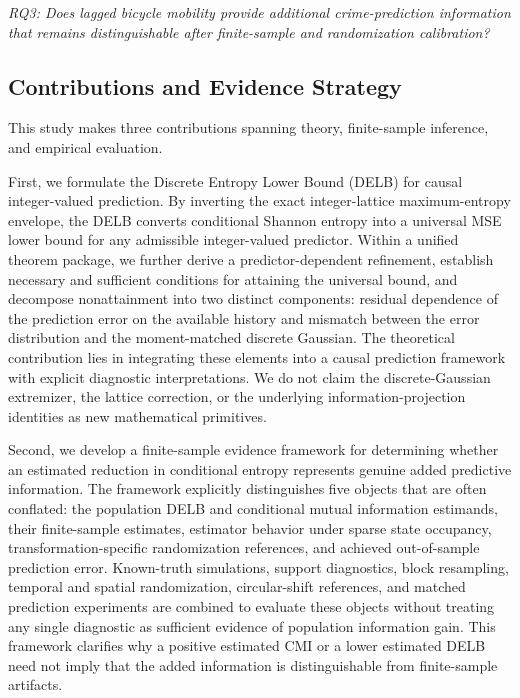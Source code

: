 \documentclass[applsci,article,submit,moreauthors]{Definitions/mdpi}
\begin{document}
\emph{RQ3: Does lagged bicycle mobility provide additional crime-prediction
information that remains distinguishable after finite-sample and
randomization calibration?}

\subsection{Contributions and Evidence Strategy}
\label{subsec:intro_contributions}

This study makes three contributions spanning theory, finite-sample
inference, and empirical evaluation.

First, we formulate the Discrete Entropy Lower Bound (DELB) for causal
integer-valued prediction. By inverting the exact integer-lattice
maximum-entropy envelope, the DELB converts conditional Shannon entropy
into a universal MSE lower bound for any admissible integer-valued
predictor. Within a unified theorem package, we further derive a
predictor-dependent refinement, establish necessary and sufficient
conditions for attaining the universal bound, and decompose nonattainment
into two distinct components: residual dependence of the prediction error
on the available history and mismatch between the error distribution and
the moment-matched discrete Gaussian. The theoretical contribution lies
in integrating these elements into a causal prediction framework with
explicit diagnostic interpretations. We do not claim the discrete-Gaussian
extremizer, the lattice correction, or the underlying information-projection
identities as new mathematical primitives.

Second, we develop a finite-sample evidence framework for determining
whether an estimated reduction in conditional entropy represents genuine
added predictive information. The framework explicitly distinguishes five
objects that are often conflated: the population DELB and conditional
mutual information estimands, their finite-sample estimates, estimator
behavior under sparse state occupancy, transformation-specific
randomization references, and achieved out-of-sample prediction error.
Known-truth simulations, support diagnostics, block resampling, temporal
and spatial randomization, circular-shift references, and matched
prediction experiments are combined to evaluate these objects without
treating any single diagnostic as sufficient evidence of population
information gain. This framework clarifies why a positive estimated
CMI or a lower estimated DELB need not imply that the added information
is distinguishable from finite-sample artifacts.
\end{document}
